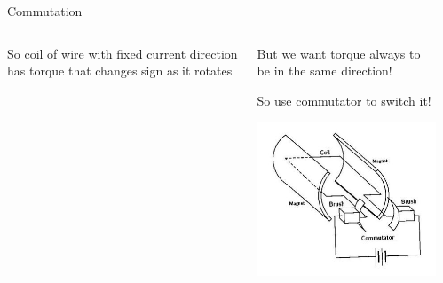 \documentclass[compress]{beamer}
\begin{document}
\begin{frame}{Commutation}

    \begin{columns}
        \begin{column}{0.3\linewidth}
            So coil of wire with fixed current direction has torque that changes
            sign as it rotates

            \vspace{2em}
        \end{column}
        \begin{column}{0.3\linewidth}
            But we want torque always to be in the same direction!

            So use commutator to switch it!

            \vspace{2em}
            \begin{center}
                \includegraphics[width=0.8\linewidth]{image22}
            \end{center}
        \end{column}
        \begin{column}{0.3\linewidth}


\end{column}
\end{columns}
\end{frame}
\end{document}
